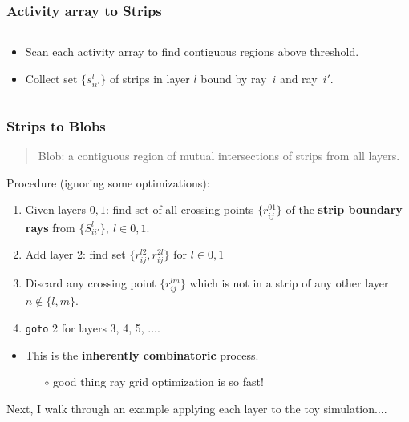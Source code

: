 \documentclass[xcolor=dvipsnames]{beamer}
\begin{document}
\begin{frame}
  \frametitle{Activity array to Strips}
  \begin{columns}
    \begin{column}{0.35\textwidth}
      \footnotesize
      \begin{itemize}
      \item Scan each activity array to find contiguous regions above threshold.
      \item Collect set  $\{s_{ii'}^l\}$ of strips in layer $l$ bound by ray~$i$ and ray~$i'$.
      \end{itemize}
      
    \end{column}

    \begin{column}{0.7\textwidth}

      \begin{center}
        \tiny
        
      \end{center}
    \end{column}

  \end{columns}
\end{frame}

\begin{frame}
  \frametitle{Strips to Blobs}
  \begin{quote}
    Blob: a contiguous region of mutual intersections of strips from all layers.
  \end{quote}
  Procedure (ignoring some optimizations):

  \begin{enumerate}
  \item Given layers $0,1$: find set of all crossing points $\{r_{ij}^{01}\}$ of the \textbf{strip boundary rays} from $\{S_{ii'}^l\},\ l \in{0,1}$.
  \item Add layer 2: find set $\{r_{ij}^{l2}, r_{ij}^{2l}\}$ for $l \in {0,1}$
  \item Discard any crossing point $\{r_{ij}^{lm}\}$ which is not in a strip of any other layer $n \not\in \{l,m\}$.
  \item \texttt{goto} 2 for layers 3, 4, 5, ....
  \end{enumerate}

  \begin{itemize}
  \item This is the \textbf{inherently combinatoric} process.
    \begin{itemize}\footnotesize
    \item[$\circ$] good thing ray grid optimization is so fast!
    \end{itemize}
  \end{itemize}

  Next, I walk through an example applying each layer to the toy simulation....
\end{frame}
\end{document}
